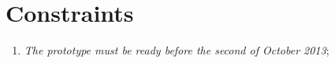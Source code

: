 \section{Constraints}
\begin{enumerate}
\item \emph{The prototype must be ready before the second of October 2013};
\end{enumerate}